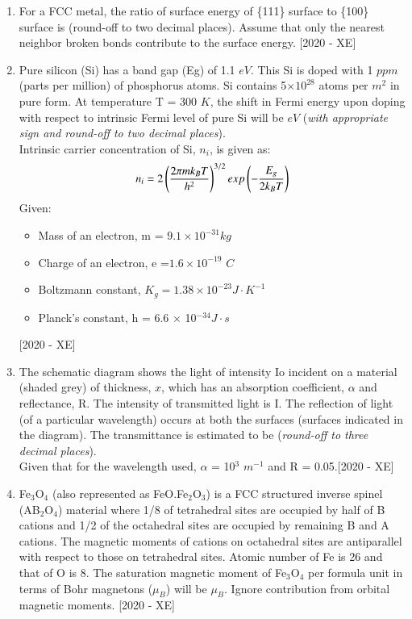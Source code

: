 \documentclass[journal]{IEEEtran}
\begin{document}
\begin{enumerate}
    \item For a FCC metal, the ratio of surface energy of \{111\} surface to \{100\} surface is \underline{\hspace{3cm}} (round-off to two decimal places). Assume that only the nearest neighbor broken bonds contribute to the surface energy. \hfill{[2020 - XE]}
    \item  Pure silicon (Si) has a band gap (Eg) of 1.1 $eV$. This Si is doped with 1 $ppm$ (parts per million) of phosphorus atoms. Si contains 5$\times 10^{28}$ atoms per $m^2$ in pure form. At temperature T = 300 $K$, the shift in Fermi energy upon doping with respect to intrinsic Fermi level of pure Si will be \underline{\hspace{3cm}} $eV$ (\textit{with appropriate sign and round-off to two decimal places}).\\
    Intrinsic carrier concentration of Si, $n_i$, is given as:
    $$n_i = 2\left(\frac{2\pi mk_B T}{h^2}\right)^{3/2} exp\left(-\frac{E_g}{2k_B T}\right)$$
    Given:
    \begin{itemize}
        \item Mass of an electron, m = $9.1 \times 10^{-31} kg$
        \item Charge of an electron, e =$1.6 \times 10^{-19}$ $C$
        \item Boltzmann constant, $K_g = 1.38 \times 10^{-23} J\cdot K^{-1}$
        \item Planck's constant, h = 6.6 $\times$ 10$^{-34} J\cdot s$
    \end{itemize}\hfill{[2020 - XE]}
    \item The schematic diagram shows the light of intensity Io incident on a material (shaded grey) of thickness, $x$, which has an absorption coefficient, $\alpha$ and reflectance, R. The intensity of transmitted light is I. The reflection of light (of a particular wavelength) occurs at both the surfaces (surfaces indicated in the diagram). The transmittance is estimated to be \underline{\hspace{3cm}} (\textit{round-off to three decimal places}).\\
    Given that for the wavelength used, $\alpha$ = 10$^3$ $m^{-1}$ and R = 0.05.\hfill{[2020 - XE]}
    
    \item Fe$_3$O$_4$ (also represented as FeO.Fe$_2$O$_3$) is a FCC structured inverse spinel (AB$_2$O$_4$) material where 1/8 of tetrahedral sites are occupied by half of B cations and 1/2 of the octahedral sites are occupied by remaining B and A cations. The magnetic moments of cations on octahedral sites are antiparallel with respect to those on tetrahedral sites. Atomic number of Fe is 26 and that of O is 8. The saturation magnetic moment of Fe$_3$O$_4$ per formula unit in terms of Bohr magnetons ($\mu_B$) will be \underline{\hspace{3cm}} $\mu_B$. Ignore contribution from orbital magnetic moments. \hfill{[2020 - XE]}

\end{enumerate}
\end{document}
